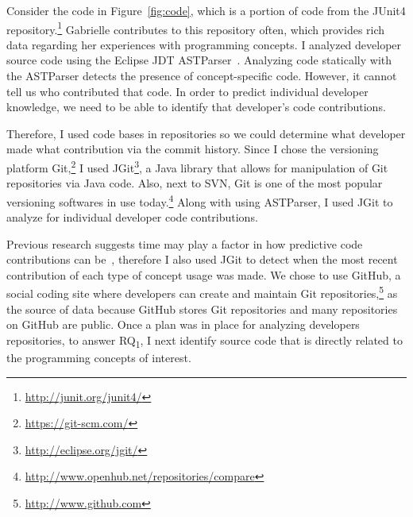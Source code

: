 Consider the code in Figure~\ref{fig:code}, which is a portion of code from the JUnit4 repository.\footnote{\url{http://junit.org/junit4/}} Gabrielle contributes to this repository often, which provides rich data regarding her experiences with programming concepts. I analyzed developer source code using the Eclipse JDT ASTParser~\cite{eclipseASTParser}. Analyzing code statically with the ASTParser detects the presence of concept-specific code. However, it cannot tell us who contributed that code. In order to predict individual developer knowledge, we need to be able to identify that developer's code contributions.

Therefore, I used code bases in repositories so we could determine what developer made what contribution via the commit history. Since I chose the versioning platform Git,\footnote{\url{https://git-scm.com/}} I used JGit\footnote{\url{http://eclipse.org/jgit/}}, a Java library that allows for manipulation of Git repositories via Java code. Also,  next to SVN, Git is one of the most popular versioning softwares in use today.\footnote{\url{http://www.openhub.net/repositories/compare}}  Along with using ASTParser, I used JGit to analyze for individual developer code contributions. 

Previous research suggests time may play a factor in how predictive code contributions can be~\cite{johnson2015bespoke}, therefore I also used JGit to detect when the most recent contribution of each type of concept usage was made.
We chose to use GitHub, a social coding site where developers can create and maintain Git repositories,\footnote{\url{http://www.github.com}} as the source of data because GitHub stores Git repositories and many repositories on GitHub are public.
Once a plan was in place for analyzing developers repositories, to answer RQ\textsubscript{1}, I next identify source code that is directly related to the programming concepts of interest. 


